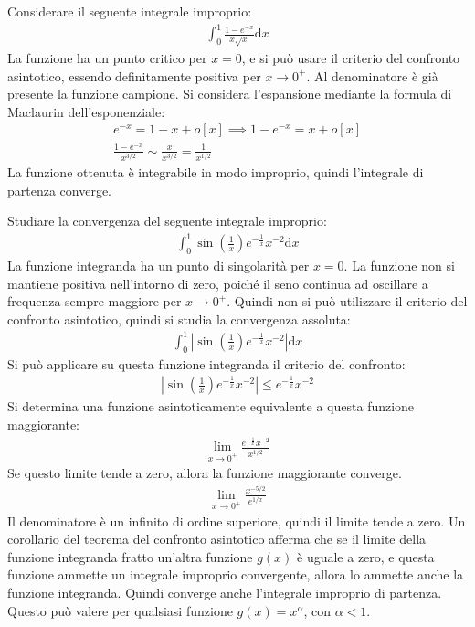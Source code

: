 \documentclass{article}
\numberwithin{equation}{subsection}
\begin{document}
Considerare il seguente integrale improprio:
\begin{gather*}
    \displaystyle\int_0^1\frac{1-e^{-x}}{x\sqrt{x}}\mathrm{d}x
\end{gather*}
La funzione ha un punto critico per $x=0$, e si può usare il criterio del confronto asintotico, essendo definitamente positiva per $x\to0^+$. Al denominatore è già presente la funzione campione. Si considera l'espansione mediante la formula di Maclaurin dell'esponenziale:
\begin{gather*}
    e^{-x}=1-x+o[x]\implies1-e^{-x}=x+o[x]\\
    \displaystyle\frac{1-e^{-x}}{x^{3/2}}\sim\frac{x}{x^{3/2}}=\frac{1}{x^{1/2}}
\end{gather*}
La funzione ottenuta è integrabile in modo improprio, quindi l'integrale di partenza converge. 



Studiare la convergenza del seguente integrale improprio:
\begin{gather*}
    \displaystyle\int_0^1\sin\left(\frac{1}{x}\right)e^{-\frac{1}{x}}x^{-2}\mathrm{d}x
\end{gather*}
La funzione integranda ha un punto di singolarità per $x=0$. La funzione non si mantiene positiva nell'intorno di zero, poiché il seno continua ad oscillare a frequenza sempre maggiore per $x\to0^+$. Quindi non si può utilizzare il criterio del confronto asintotico, quindi si studia la convergenza assoluta:
\begin{gather*}
    \displaystyle\int_0^1\left|\sin\left(\frac{1}{x}\right)e^{-\frac{1}{x}}x^{-2}\right|\mathrm{d}x
\end{gather*}
Si può applicare su questa funzione integranda il criterio del confronto:
\begin{gather*}
    \left|\sin\left(\frac{1}{x}\right)e^{-\frac{1}{x}}x^{-2}\right|\leq e^{-\frac{1}{x}}x^{-2}
\end{gather*}
Si determina una funzione asintoticamente equivalente a questa funzione maggiorante:
\begin{gather*}
    \lim_{x\to0^+}\displaystyle\frac{e^{-\frac{1}{x}}x^{-2}}{x^{1/2}}
\end{gather*}
Se questo limite tende a zero, allora la funzione maggiorante converge. 
\begin{gather*}
    \lim_{x\to0^+}\displaystyle\frac{x^{-5/2}}{e^{1/x}}
\end{gather*}
Il denominatore è un infinito di ordine superiore, quindi il limite tende a zero. Un corollario del teorema del confronto asintotico afferma che se il limite della funzione integranda fratto un'altra funzione $g(x)$ è uguale a zero, e questa funzione ammette un integrale improprio convergente, allora lo ammette anche la funzione integranda. Quindi converge anche l'integrale improprio di partenza. 
Questo può valere per qualsiasi funzione $g(x)=x^\alpha$, con $\alpha<1$. 
\end{document}
